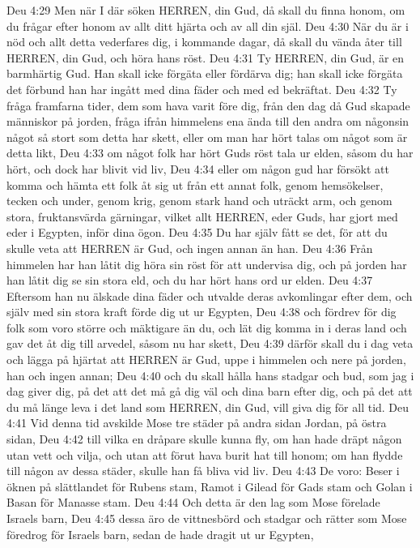 Deu 4:29  Men när I där söken HERREN, din Gud, då skall du finna honom, om du frågar efter honom av allt ditt hjärta och av all din själ.
Deu 4:30  När du är i nöd och allt detta vederfares dig, i kommande dagar, då skall du vända åter till HERREN, din Gud, och höra hans röst.
Deu 4:31  Ty HERREN, din Gud, är en barmhärtig Gud. Han skall icke förgäta eller fördärva dig; han skall icke förgäta det förbund han har ingått med dina fäder och med ed bekräftat.
Deu 4:32  Ty fråga framfarna tider, dem som hava varit före dig, från den dag då Gud skapade människor på jorden, fråga ifrån himmelens ena ända till den andra om någonsin något så stort som detta har skett, eller om man har hört talas om något som är detta likt,
Deu 4:33  om något folk har hört Guds röst tala ur elden, såsom du har hört, och dock har blivit vid liv,
Deu 4:34  eller om någon gud har försökt att komma och hämta ett folk åt sig ut från ett annat folk, genom hemsökelser, tecken och under, genom krig, genom stark hand och uträckt arm, och genom stora, fruktansvärda gärningar, vilket allt HERREN, eder Guds, har gjort med eder i Egypten, inför dina ögon.
Deu 4:35  Du har själv fått se det, för att du skulle veta att HERREN är Gud, och ingen annan än han.
Deu 4:36  Från himmelen har han låtit dig höra sin röst för att undervisa dig, och på jorden har han låtit dig se sin stora eld, och du har hört hans ord ur elden.
Deu 4:37  Eftersom han nu älskade dina fäder och utvalde deras avkomlingar efter dem, och själv med sin stora kraft förde dig ut ur Egypten,
Deu 4:38  och fördrev för dig folk som voro större och mäktigare än du, och lät dig komma in i deras land och gav det åt dig till arvedel, såsom nu har skett,
Deu 4:39  därför skall du i dag veta och lägga på hjärtat att HERREN är Gud, uppe i himmelen och nere på jorden, han och ingen annan;
Deu 4:40  och du skall hålla hans stadgar och bud, som jag i dag giver dig, på det att det må gå dig väl och dina barn efter dig, och på det att du må länge leva i det land som HERREN, din Gud, vill giva dig för all tid.
Deu 4:41  Vid denna tid avskilde Mose tre städer på andra sidan Jordan, på östra sidan,
Deu 4:42  till vilka en dråpare skulle kunna fly, om han hade dräpt någon utan vett och vilja, och utan att förut hava burit hat till honom; om han flydde till någon av dessa städer, skulle han få bliva vid liv.
Deu 4:43  De voro: Beser i öknen på slättlandet för Rubens stam, Ramot i Gilead för Gads stam och Golan i Basan för Manasse stam.
Deu 4:44  Och detta är den lag som Mose förelade Israels barn,
Deu 4:45  dessa äro de vittnesbörd och stadgar och rätter som Mose föredrog för Israels barn, sedan de hade dragit ut ur Egypten,

